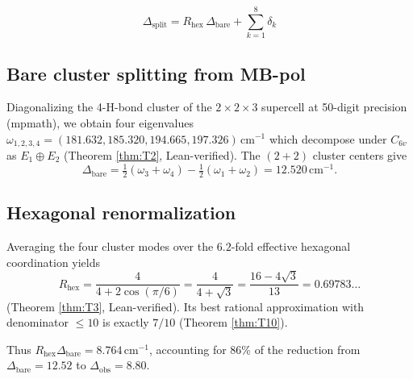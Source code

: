 \documentclass[11pt,a4paper]{article}
\begin{document}
\begin{equation}
\boxed{\quad
\Delta_\text{split} = R_\text{hex}\,\Delta_\text{bare} + \sum_{k=1}^{8} \delta_k
\quad}
\label{eq:splitting}
\end{equation}

\subsection{Bare cluster splitting from MB-pol}
Diagonalizing the 4-H-bond cluster of the $2{\times}2{\times}3$ supercell at 50-digit precision (mpmath), we obtain four eigenvalues $\omega_{1,2,3,4} = (181.632, 185.320, 194.665, 197.326)$\,cm$^{-1}$ which decompose under $C_{6v}$ as $E_1 \oplus E_2$ (Theorem \ref{thm:T2}, Lean-verified). The $(2+2)$ cluster centers give
\[
\Delta_\text{bare} = \tfrac{1}{2}(\omega_3+\omega_4) - \tfrac{1}{2}(\omega_1+\omega_2) = 12.520\,\mathrm{cm}^{-1}.
\]

\subsection{Hexagonal renormalization}
Averaging the four cluster modes over the $6.2$-fold effective hexagonal coordination yields
\[
R_\text{hex} = \frac{4}{4+2\cos(\pi/6)} = \frac{4}{4+\sqrt{3}} = \frac{16-4\sqrt{3}}{13} = 0.69783\ldots
\]
(Theorem \ref{thm:T3}, Lean-verified). Its best rational approximation with denominator $\le 10$ is exactly $7/10$ (Theorem \ref{thm:T10}).

Thus $R_\text{hex}\Delta_\text{bare} = 8.764$\,cm$^{-1}$, accounting for 86\% of the reduction from $\Delta_\text{bare} = 12.52$ to $\Delta_\text{obs} = 8.80$.
\end{document}
